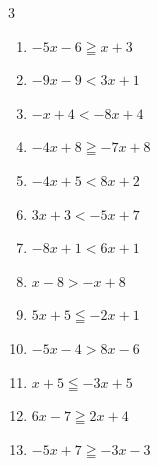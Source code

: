 \begin{multicols}{3}
\begin{enumerate}

  \item $-5x-6\geqq x+3$


  \item $-9x-9<3x+1$


  \item $-x+4<-8x+4$

        \phantom{$\displaystyle x<0$}

  \item $-4x+8\geqq -7x+8$

        \phantom{$\displaystyle x\geqq 0$}

  \item $-4x+5<8x+2$


  \item $3x+3<-5x+7$


\columnbreak %

  \item $-8x+1<6x+1$

        \phantom{$\displaystyle x>0$}

  \item $x-8>-x+8$

        \phantom{$\displaystyle x>8$}

  \item $5x+5\leqq -2x+1$


  \item $-5x-4>8x-6$


  \item $x+5\leqq -3x+5$

        \phantom{$\displaystyle x\leqq 0$}

  \item $6x-7\geqq 2x+4$


  \item $-5x+7\geqq -3x-3$

        \phantom{$\displaystyle x\leqq 5$}


\end{enumerate}
\end{multicols}
